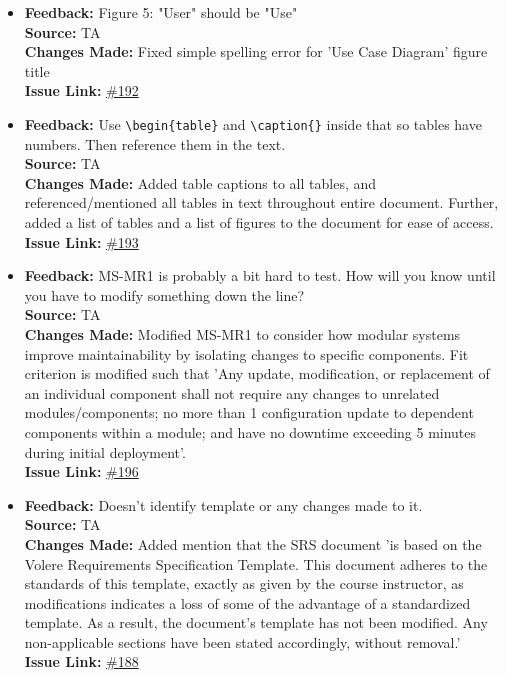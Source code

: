 \documentclass{article}
\begin{document}
\begin{itemize}
  \item 
    \textbf{Feedback:} Figure 5: "User" should be "Use" \\
    \textbf{Source:} TA \\
    \textbf{Changes Made:} Fixed simple spelling error for 'Use Case Diagram' figure title\\
    \textbf{Issue Link:} \href{https://github.com/parishanizam/TeleHealth/issues/192}{\#192}

  \item 
    \textbf{Feedback:} Use \texttt{\textbackslash begin\{table\}} and \texttt{\textbackslash caption\{\}} inside that so tables have numbers. Then reference them in the text. \\
    \textbf{Source:} TA \\
    \textbf{Changes Made:} Added table captions to all tables, and referenced/mentioned all tables in text throughout entire document. Further, added a list of tables and a list of figures to the document for ease of access.\\
    \textbf{Issue Link:} \href{https://github.com/parishanizam/TeleHealth/issues/193}{\#193}

  \item 
    \textbf{Feedback:} MS-MR1 is probably a bit hard to test. How will you know until you have to modify something down the line? \\
    \textbf{Source:} TA \\
    \textbf{Changes Made:} Modified MS-MR1 to consider how modular systems improve maintainability by isolating changes to specific components. Fit criterion is modified such that 'Any update, modification, or replacement of an individual component
    shall not require any changes to unrelated modules/components; no more than 1 configuration update to dependent components within a module; and have no downtime exceeding 5 minutes during initial deployment'.\\
    \textbf{Issue Link:} \href{https://github.com/parishanizam/TeleHealth/issues/196}{\#196}

  \item 
    \textbf{Feedback:} Doesn't identify template or any changes made to it. \\
    \textbf{Source:} TA \\
    \textbf{Changes Made:} Added mention that the SRS document 'is based on the Volere Requirements Specification Template. This document adheres to the standards of this template,
    exactly as given by the course instructor, as modifications indicates a loss of some of the advantage of a standardized template. As a result, the document's
    template has not been modified. Any non-applicable sections have been stated accordingly, without removal.'\\
    \textbf{Issue Link:} \href{https://github.com/parishanizam/TeleHealth/issues/188}{\#188}


\end{itemize}
\end{document}
